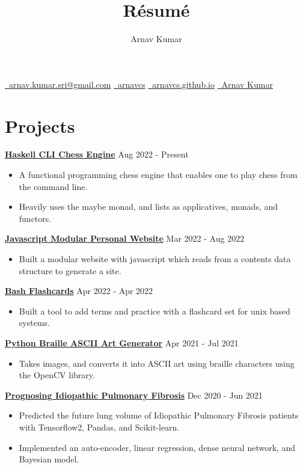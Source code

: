 \documentclass{article}
\makeatletter
\renewcommand{\maketitle}{
    \begin{center}

        {\color{MyBlue3}\Huge\bfseries
            \theauthor
        }

        \vspace{0.3em}

        {
            \href{mailto:arnav.kumar.sri@gmail.com}{\faEnvelope \ arnav.kumar.sri@gmail.com} \quad
            \href{https://github.com/arnavcs}{\faGithub \ arnavcs} \quad
            \href{https://arnavcs.github.io/}{\faGlobe \ arnavcs.github.io} \quad
            \href{https://www.linkedin.com/in/arnav-kumar-0644881a3/}{\faLinkedin \ Arnav Kumar}
        }

    \end{center}
}
\newcommand{\moduleHeadT}[2]{
    \vspace{0.5em}
    \textbf{#1} \dotfill #2 \\[0em]
}
\newenvironment{compactList}
{
    \vspace{-2em}
    \begin{itemize}[itemsep=-5pt, label=$-$]
}
{
    \end{itemize}
    \vspace{-0.8em}
}
\makeatother
\begin{document}
\title{R\'esum\'e}
\author{Arnav Kumar}

\maketitle


\section{Projects}

\moduleHeadT{\href{https://github.com/arnavcs/cli-chess-engine}{Haskell CLI Chess Engine}}{Aug 2022 - Present}
\begin{compactList}
    \item A functional programming chess engine that enables one to play chess from the command line.
    \item Heavily uses the maybe monad, and  lists as applicatives, monads, and functors.
\end{compactList}

\moduleHeadT{\href{https://github.com/arnavcs/arnavcs.github.io}{Javascript Modular Personal Website}}{Mar 2022 - Aug 2022}
\begin{compactList}
    \item Built a modular website with javascript which reads from a contents data structure to generate a site.
\end{compactList}

\moduleHeadT{\href{https://github.com/arnavcs/flashcards}{Bash Flashcards}}{Apr 2022 - Apr 2022}
\begin{compactList}
    \item Built a tool to add terms and practice with a flashcard set for unix based systems.
\end{compactList}

\moduleHeadT{\href{https://github.com/arnavcs/ASCII-art}{Python Braille ASCII Art Generator}}{Apr 2021 - Jul 2021}
\begin{compactList}
    \item Takes images, and converts it into ASCII art using braille characters using the OpenCV library.
\end{compactList}

\moduleHeadT{\href{https://github.com/arnavcs/OSIC-IPF}{Prognosing Idiopathic Pulmonary Fibrosis}}{Dec 2020 - Jun 2021}
\begin{compactList}
    \item Predicted the future lung volume of Idiopathic Pulmonary Fibrosis patients with Tensorflow2, Pandas, and Scikit-learn. 
    \item Implemented an auto-encoder, linear regression, dense neural network, and Bayesian model.
\end{compactList}
\end{document}
